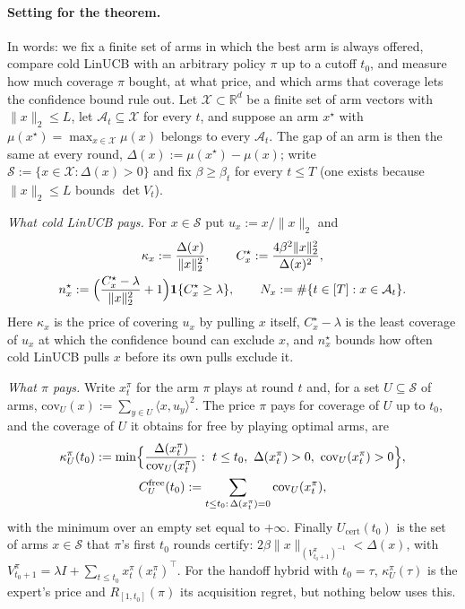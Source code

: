 \documentclass[anon]{alt2027} %
\newcommand{\R}{\mathbb{R}}
\newcommand{\ind}{\mathbf{1}}
\begin{document}
\paragraph{Setting for the theorem.}
In words: we fix a finite set of arms in which the best arm is always
offered, compare cold LinUCB with an arbitrary policy $\pi$ up to a cutoff
$t_0$, and measure how much coverage $\pi$ bought, at what price, and which
arms that coverage lets the confidence bound rule out. Let
$\mathcal X\subset\R^d$ be a finite set of arm vectors with $\|x\|_2\le L$,
let $\mathcal A_t\subseteq\mathcal X$ for every $t$, and suppose an arm
$x^\star$ with $\mu(x^\star)=\max_{x\in\mathcal X}\mu(x)$ belongs to every
$\mathcal A_t$. The gap of an arm is then the same at every round,
$\Delta(x):=\mu(x^\star)-\mu(x)$; write $\mathcal S:=\{x\in\mathcal X:\Delta(x)>0\}$
and fix $\beta\ge\beta_t$ for every $t\le T$ (one exists because
$\|x\|_2\le L$ bounds $\det V_t$).

\emph{What cold LinUCB pays.} For $x\in\mathcal S$ put $u_x:=x/\|x\|_2$ and
\begin{gather*}
\kappa_x:=\frac{\Delta(x)}{\|x\|_2^2},\qquad
C^\star_x:=\frac{4\beta^2\|x\|_2^2}{\Delta(x)^2},\\
n^\star_x:=\Bigl(\frac{C^\star_x-\lambda}{\|x\|_2^2}+1\Bigr)\ind\{C^\star_x\ge\lambda\},\qquad
N_x:=\#\{t\in[T]:x\in\mathcal A_t\}.
\end{gather*}
Here $\kappa_x$ is the price of covering $u_x$ by pulling $x$ itself,
$C^\star_x-\lambda$ is the least coverage of $u_x$ at which the confidence
bound can exclude $x$, and $n^\star_x$ bounds how often cold LinUCB pulls $x$
before its own pulls exclude it.

\emph{What $\pi$ pays.} Write $x^\pi_t$ for the arm $\pi$ plays at round $t$
and, for a set $U\subseteq\mathcal S$ of arms,
$\mathrm{cov}_U(x):=\sum_{y\in U}\langle x,u_y\rangle^2$. The price $\pi$ pays
for coverage of $U$ up to $t_0$, and the coverage of $U$ it obtains for free
by playing optimal arms, are
\begin{gather*}
\kappa^\pi_U(t_0):=\min\Bigl\{\frac{\Delta(x^\pi_t)}{\mathrm{cov}_U(x^\pi_t)}:
\ t\le t_0,\ \Delta(x^\pi_t)>0,\ \mathrm{cov}_U(x^\pi_t)>0\Bigr\},
\\
C^{\mathrm{free}}_U(t_0):=\sum_{t\le t_0:\,\Delta(x^\pi_t)=0}\mathrm{cov}_U(x^\pi_t),
\end{gather*}
with the minimum over an empty set equal to $+\infty$. Finally
$U_{\mathrm{cert}}(t_0)$ is the set of arms $x\in\mathcal S$ that $\pi$'s
first $t_0$ rounds certify: $2\beta\|x\|_{(V^\pi_{t_0+1})^{-1}}<\Delta(x)$, with
$V^\pi_{t_0+1}=\lambda I+\sum_{t\le t_0}x^\pi_t (x^\pi_t)^\top$. For the
handoff hybrid with $t_0=\tau$, $\kappa^\pi_U(\tau)$ is the expert's price and
$R_{[1,t_0]}(\pi)$ its acquisition regret, but nothing below uses this.
\end{document}
